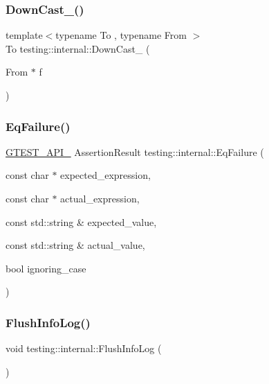 \subsubsection{\texorpdfstring{Down\+Cast\+\_\+()}{DownCast\_()}}
{\footnotesize\ttfamily template$<$typename To , typename From $>$ \\
To testing\+::internal\+::\+Down\+Cast\+\_\+ (\begin{DoxyParamCaption}\item[{From $\ast$}]{f }\end{DoxyParamCaption})\hspace{0.3cm}{\ttfamily [inline]}}

\mbox{\label{namespacetesting_1_1internal_ac61e2ba2cbf259fd6ee5ffd4e49c9445}} 
\subsubsection{\texorpdfstring{Eq\+Failure()}{EqFailure()}}
{\footnotesize\ttfamily \hyperlink{gtest-port_8h_aa73be6f0ba4a7456180a94904ce17790}{G\+T\+E\+S\+T\+\_\+\+A\+P\+I\+\_\+} Assertion\+Result testing\+::internal\+::\+Eq\+Failure (\begin{DoxyParamCaption}\item[{const char $\ast$}]{expected\+\_\+expression,  }\item[{const char $\ast$}]{actual\+\_\+expression,  }\item[{const std\+::string \&}]{expected\+\_\+value,  }\item[{const std\+::string \&}]{actual\+\_\+value,  }\item[{bool}]{ignoring\+\_\+case }\end{DoxyParamCaption})}

\mbox{\label{namespacetesting_1_1internal_a2135f223bf6b527729aeaa651115183b}} 
\subsubsection{\texorpdfstring{Flush\+Info\+Log()}{FlushInfoLog()}}
{\footnotesize\ttfamily void testing\+::internal\+::\+Flush\+Info\+Log (\begin{DoxyParamCaption}{ }\end{DoxyParamCaption})\hspace{0.3cm}{\ttfamily [inline]}}

